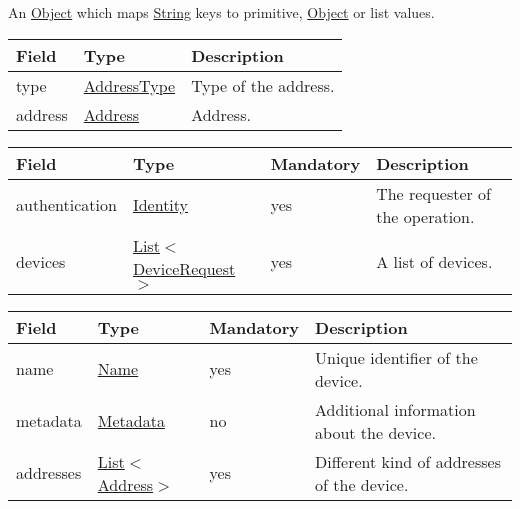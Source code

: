 \documentclass[a4paper]{arrowhead}
\newcommand{\pref}[1]{{\textcolor{ArrowheadGrey}{\hyperref[sec:model:primitives:#1]{#1}}}}
\begin{document}
\label{sec:model:Metadata}

An \pref{Object} which maps \pref{String} keys to primitive, \pref{Object} or list values.

\label{sec:model:AddressDescriptor}

\begin{table}[ht!]
\begin{tabularx}{\textwidth}{| p{2.5cm} | p{2.5cm} | X |} \hline
\rowcolor{gray!33} Field & Type & Description \\ \hline
type & \pref{AddressType} & Type of the address. \\ \hline
address & \pref{Address} & Address. \\ \hline
\end{tabularx}
\end{table}

\label{sec:model:DeviceListRequest}
 
\begin{table}[ht!]
\begin{tabularx}{\textwidth}{| p{2.5cm} | p{3.4cm} | p{2cm} | X |} \hline
\rowcolor{gray!33} Field & Type & Mandatory & Description \\ \hline
authentication & \hyperref[sec:model:Identity]{Identity} & yes & The requester of the operation. \\ \hline
devices & \pref{List}$<$\hyperref[sec:model:DeviceRequest]{DeviceRequest}$>$ & yes & A list of devices. \\ \hline
\end{tabularx}
\end{table}

\clearpage

\label{sec:model:DeviceRequest}
 
\begin{table}[ht!]
\begin{tabularx}{\textwidth}{| p{2.5cm} | p{2.5cm} | p{2cm} | X |} \hline
\rowcolor{gray!33} Field & Type & Mandatory & Description \\ \hline
name & \pref{Name} & yes & Unique identifier of the device. \\ \hline
metadata &\hyperref[sec:model:Metadata]{Metadata} & no & Additional information about the device. \\ \hline
addresses &  \pref{List}$<$\pref{Address}$>$ & yes & Different kind of addresses of the device.  \\ \hline
\end{tabularx}
\end{table}
\end{document}
